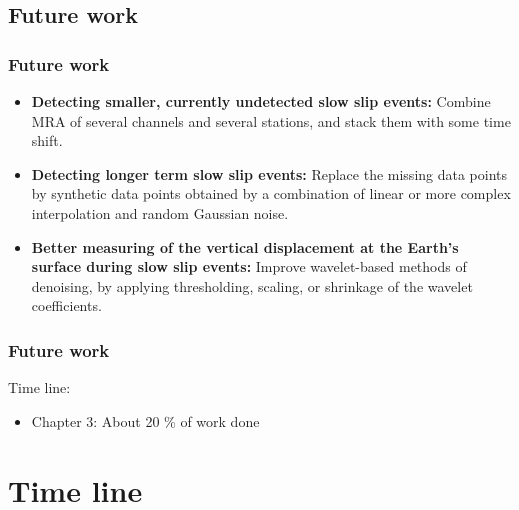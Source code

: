 \documentclass{beamer}
\begin{document}
	\subsection{Future work}

	\begin{frame}
		\frametitle{Future work}
		\begin{itemize}
			\item \textbf{Detecting smaller, currently undetected slow slip events:} Combine MRA of several channels and several stations, and stack them with some time shift.
			\item \textbf{Detecting longer term slow slip events:} Replace the missing data points by synthetic data points obtained by a combination of linear or more complex interpolation and random Gaussian noise.
			\item \textbf{Better measuring of the vertical displacement at the Earth’s surface during slow slip events:} Improve wavelet-based methods of denoising, by applying thresholding, scaling, or shrinkage of the wavelet coefficients.
		\end{itemize}
	\end{frame}

	\begin{frame}
		\frametitle{Future work}
		Time line:

		\vspace{2em}

		\begin{itemize}
			\item Chapter 3: About 20 \% of work done
		\end{itemize}
	\end{frame}


	\section*{Time line}
\end{document}
